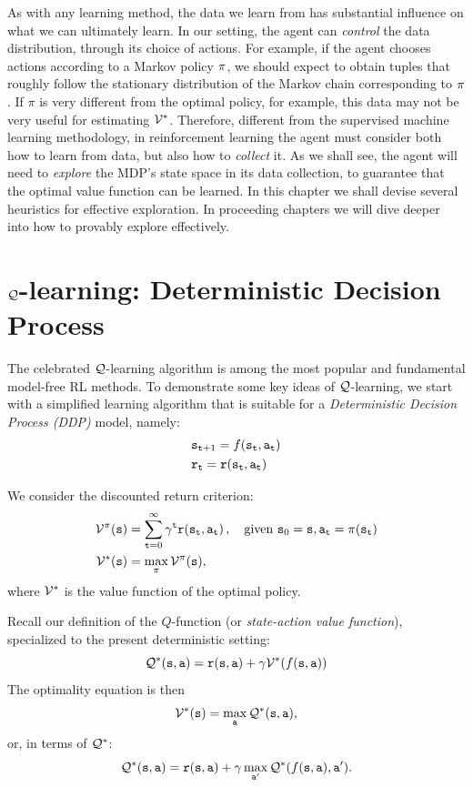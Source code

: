 As with any learning method, the data we learn from has substantial influence on what we can ultimately learn. In our setting, the agent can \textit{control} the data distribution, through its choice of actions. For example, if the agent chooses actions according to a Markov policy $\pi$, we should expect to obtain tuples that roughly follow the stationary distribution of the Markov chain corresponding to $\pi$. If $\pi$ is very different from the optimal policy, for example, this data may not be very useful for estimating $\mathcal{V}^*$. Therefore, different from the supervised machine learning methodology, in reinforcement learning the agent must consider both how to learn from data, but also how to \textit{collect} it. As we shall see, the agent will need to \textit{explore} the MDP's state space in its data collection, to guarantee that the optimal value function can be learned. In this chapter we shall devise several heuristics for effective exploration. In proceeding chapters we will dive deeper into how to provably explore effectively.


\section{ $\mathcal{Q}$-learning: Deterministic Decision Process}\label{sec:q_learning_DDP}

The celebrated $\mathcal{Q}$-learning algorithm is among the most popular and fundamental model-free RL methods.
To demonstrate some key ideas of $\mathcal{Q}$-learning, we start with a
simplified learning algorithm that is suitable for a {\em
Deterministic Decision Process (DDP)} model, namely:
\begin{align*}
& {\tt s}_{{\tt t}+1}=f({\tt s}_{\tt t},{\tt a}_{\tt t}) \\
& {\tt r}_{\tt t}={\tt r}({\tt s}_{\tt t},{\tt a}_{\tt t})
\end{align*}



We consider the discounted return criterion:
\begin{align*}
\mathcal{V}^{\pi}({\tt s}) &=\sum_{{\tt t}=0}^\infty \gamma^{\tt t}
{\tt r}({\tt s}_{\tt t},{\tt a}_{\tt t})\,,
\quad \text{given } {\tt s}_0={\tt s}, {\tt a}_{\tt t}=\pi({\tt s}_{\tt t})\\
\mathcal{V}^*({\tt s}) &= \max_\pi \mathcal{V}^\pi({\tt s}),
\end{align*}
where $\mathcal{V}^*$ is the value function of the optimal policy.

Recall our definition of the $Q$-function (or {\em state-action
value function}), specialized to the present deterministic setting:
$$
\mathcal{Q}^*({\tt s},{\tt a})={\tt r}({\tt s},{\tt a})+\gamma
\mathcal{V}^*(f({\tt s},{\tt a}))
$$
The optimality equation is then
$$
\mathcal{V}^*({\tt s}) = \max_{\tt a} \mathcal{Q}^*({\tt s},{\tt a}),
$$
or, in terms of $\mathcal{Q}^*$:
$$
\mathcal{Q}^*({\tt s},{\tt a})={\tt r}({\tt s},{\tt a})+\gamma
\max_{{\tt a}'}\mathcal{Q}^*(f({\tt s},{\tt a}),{\tt a}').
$$

